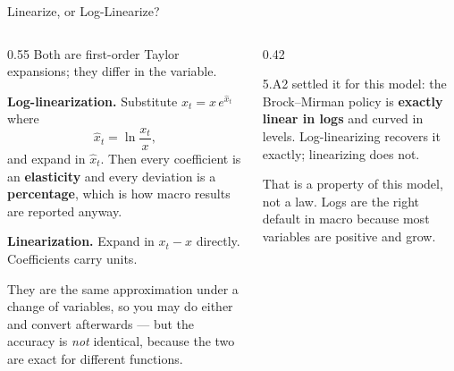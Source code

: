 \begin{frame}{Linearize, or Log-Linearize?}
\begin{columns}[T]
\begin{column}{0.55\textwidth}
\small
Both are first-order Taylor expansions; they differ in the variable.
\medskip

\textbf{Log-linearization.} Substitute $x_t = x\,e^{\hat{x}_t}$ where
\[
  \hat{x}_t = \ln\frac{x_t}{x} ,
\]
and expand in $\hat{x}_t$. Then every coefficient is an \textbf{elasticity} and every deviation is a \textbf{percentage}, which is how macro results are reported anyway.
\medskip

\textbf{Linearization.} Expand in $x_t-x$ directly. Coefficients carry units.
\medskip

They are the same approximation under a change of variables, so you may do either and convert afterwards --- but the accuracy is \emph{not} identical, because the two are exact for different functions.
\end{column}
\begin{column}{0.42\textwidth}
\begin{examplebox}[title=\textbf{Which is better here?}]\small
5.A2 settled it for this model: the Brock--Mirman policy is \textbf{exactly linear in logs} and curved in levels. Log-linearizing recovers it exactly; linearizing does not.
\end{examplebox}
\medskip
\begin{cautionbox}\footnotesize
That is a property of this model, not a law. Logs are the right default in macro because most variables are positive and grow.
\end{cautionbox}
\end{column}
\end{columns}
\vspace{1mm}
\end{frame}

